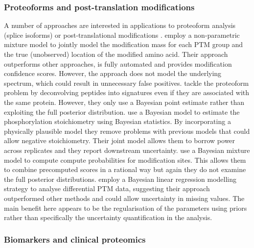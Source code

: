 \documentclass[12pt,english, journal=jpr, layout=twocolumn]{article}
\begin{document}
\subsubsection{Proteoforms and post-translation modifications}
A number of approaches are interested in applications to proteoform analysis (splice isoforms) or post-translational modifications \citep{Chung::2013, Webb::2014, Lim::2017, Shteynberg::2019, Mallikarun::2020}. \citet{Chung::2013} employ a non-parametric mixture model to jointly model the modification mass for each PTM group and the true (unobserved) location of the modified amino acid. Their approach outperforms other approaches, is fully automated and provides modification confidence scores. However, the approach does not model the underlying spectrum, which could result in unnecessary false positives. \citet{Webb::2014} tackle the proteoform problem by deconvolving peptides into signatures even if they are associated with the same protein. However, they only use a Bayesian point estimate rather than exploiting the full posterior distribution. \citet{Lim::2017} use a Bayesian model to estimate the phosphorylation stoichiometry using Bayesian statistics. By incorporating a physically plausible model they remove problems with previous models that could allow negative stoichiometry. Their joint model allows them to borrow power across replicates and they report downstream uncertainty. \citet{Shteynberg::2019} use a Bayesian mixture model to compute compute probabilities for modification sites. This allows them to combine precomputed scores in a rational way but again they do not examine the full posterior distributions. \citet{Mallikarun::2020} employ a Bayesian linear regression modelling strategy to analyse differential PTM data, suggesting their approach outperformed other methods and could allow uncertainty in missing values. The main benefit here appears to be the regularisation of the parameters using priors rather than specifically the uncertainty quantification in the analysis.

\subsubsection{Biomarkers and clinical proteomics}
\end{document}
